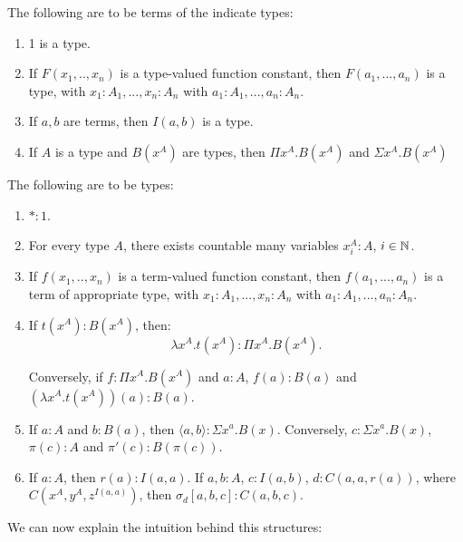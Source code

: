 \begin{definition}
  The following are to be terms of the indicate types:
  \begin{enumerate}
  \item 1 is a type.
  \item If $F(x_1,..,x_n)$ is a type-valued function constant, then $F(a_1,...,a_n)$ is a type, with  $x_1:A_1,...,x_n:A_n$ with $a_1:A_1,...,a_n:A_n$.
  \item If $a,b$ are terms, then $I(a,b)$ is a type.
  \item If $A$ is a type and $B(x^A)$ are types, then $\Pi x^A. B(x^A)$ and  $\Sigma x^A. B(x^A)$
  \end{enumerate}
\end{definition}

\begin{definition}\label{1.1.2-seely}
  The following are to be types:
  \begin{enumerate}
  \item $*:1$.
  \item For every type $A$, there exists countable many variables $x_i^A : A$, $i\in \mathbb{N}$.
  \item If $f(x_1,..,x_n)$ is a term-valued function constant, then $f(a_1,...,a_n)$ is a term of appropriate type, with  $x_1:A_1,...,x_n:A_n$ with $a_1:A_1,...,a_n:A_n$.
  \item If $t(x^A) : B(x^A)$, then:
    $$\lambda x^A.t(x^A) : \Pi x^A. B(x^A).$$

    Conversely, if $f : \Pi x^A. B(x^A)$ and $a:A$, $f(a) : B(a)$ and $(\lambda x^A.t(x^A))(a) : B(a)$.
  \item If $a:A$ and $b:B(a)$, then $\langle a, b\rangle : \Sigma x^a. B(x)$. Conversely, $c : \Sigma x^a. B(x)$, $\pi (c) : A$ and $\pi'(c) : B(\pi(c))$. 
  \item If $a:A$, then $r(a): I(a,a)$. If $a,b : A$, $c : I(a,b)$, $d : C(a,a,r(a))$, where $C(x^A,y^A,z^{I(a,a)})$, then $\sigma_d[a,b,c] : C(a,b,c)$.  
  \end{enumerate}
\end{definition}


We can now explain the intuition behind this structures:

